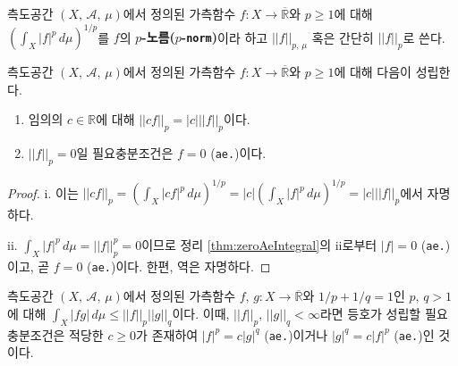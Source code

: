 \begin{definition}
    측도공간 $(X,\,\mathcal{A},\,\mu)$에서 정의된 가측함수 $f:X\to\overline{\mathbb{R}}$와 $p\geq1$에 대해 $(\int_X|f|^p\,d\mu)^{1/p}$를 $f$의 \textbf{$p$-노름($p$-\texttt{norm})}이라 하고 $||f||_{p,\,\mu}$ 혹은 간단히 $||f||_p$로 쓴다.
\end{definition}

\begin{proposition}\label{prop:lpnormScale}
    측도공간 $(X,\,\mathcal{A},\,\mu)$에서 정의된 가측함수 $f:X\to\overline{\mathbb{R}}$와 $p\geq1$에 대해 다음이 성립한다.
    \begin{enumerate}
        \item 임의의 $c\in\mathbb{R}$에 대해 $||cf||_p=|c|||f||_p$이다.
        \item $||f||_p=0$일 필요충분조건은 $f=0$ (\texttt{ae.})이다.
    \end{enumerate}
\end{proposition}

\begin{proof}
    i. 이는 $||cf||_p=(\int_X|cf|^p\,d\mu)^{1/p}=|c|(\int_X|f|^p\,d\mu)^{1/p}=|c|||f||_p$에서 자명하다.

    ii. $\int_X|f|^p\,d\mu=||f||_p^p=0$이므로 정리 \ref{thm:zeroAeIntegral}의 ii로부터  $|f|=0$ (\texttt{ae.})이고, 곧 $f=0$ (\texttt{ae.})이다. 한편, 역은 자명하다.
\end{proof}

\begin{theorem}
    측도공간 $(X,\,\mathcal{A},\,\mu)$에서 정의된 가측함수 $f,\,g:X\to\overline{\mathbb{R}}$와 $1/p+1/q=1$인 $p,\,q>1$에 대해 $\int_X|fg|\,d\mu\leq||f||_p||g||_q$이다. 이때, $||f||_p,\,||g||_q<\infty$라면 등호가 성립할 필요충분조건은 적당한 $c\geq0$가 존재하여 $|f|^p=c|g|^q$ (\texttt{ae.})이거나 $|g|^q=c|f|^p$ (\texttt{ae.})인 것이다.
\end{theorem}

